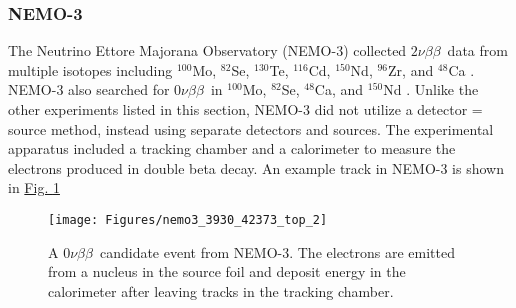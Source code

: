 \documentclass[12pt,a4paper]{article}
\newcommand{\zeronubb}{$0\nu \beta \beta$}
\newcommand{\twonubb}{$2\nu \beta \beta$}
\begin{document}
\begin{comment}
\subsubsection*{EXO-200}
The Enriched Xenon Observatory (EXO) is an experiment searching for \zeronubb~in 80.6\% enriched $^{136}$Xe \cite{Albert:2014awa}. The Xe is used as a liquid time projection chamber (TPC) that can record the spatial components of ionization signals. This experiment benefits from the self-shielding of Xe, as the $\gamma$ attenuation length can be much smaller than the size of the detector itself.

\begin{figure}[htpb]
\centering
\texttt{[image: Figures/EXO.png]}
\caption[Cutaway view of the EXO-200 experimental apparatus.]{Cutaway view of the EXO-200 experimental apparatus. Figure from \cite{Auger:2012gs}}
\label{fig:jinst1205p05010}
\end{figure}
\end{comment}

\subsubsection*{NEMO-3}
The Neutrino Ettore Majorana Observatory (NEMO-3) collected \twonubb~data from multiple isotopes including $^{100}$Mo, $^{82}$Se, $^{130}$Te, $^{116}$Cd, $^{150}$Nd, $^{96}$Zr, and $^{48}$Ca \cite{Bongrand:2011ei}. NEMO-3 also searched for \zeronubb~in $^{100}$Mo, $^{82}$Se, $^{48}$Ca, and $^{150}$Nd \cite{Bongrand:2011ei}\cite{::2016dpe}\cite{Arnold:2016ezh}. Unlike the other experiments listed in this section, NEMO-3 did not utilize a detector = source method, instead using separate detectors and sources. The experimental apparatus included a tracking chamber and a calorimeter to measure the electrons produced in double beta decay. An example track in NEMO-3 is shown in \hyperref[fig:nemo3393042373top2]{Fig. \ref*{fig:nemo3393042373top2}}

\begin{figure}[htbp]
\centering
\texttt{[image: Figures/nemo3\_3930\_42373\_top\_2]}
\caption{A \zeronubb~candidate event from NEMO-3. The electrons are emitted from a nucleus in the source foil and deposit energy in the calorimeter after leaving tracks in the tracking chamber.}
\label{fig:nemo3393042373top2}
\end{figure}


\end{document}
